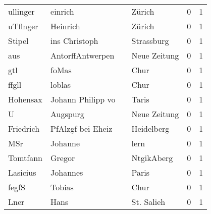 \begin{tabular}{llllrr}
                 ullinger &                            einrich &             &                                      Zürich &          0 &         1 \\
                 uTflnger &                           Heinrich &             &                                      Zürich &          0 &         1 \\
                   Stipel &                      ins Christoph &             &                                  Strassburg &          0 &         1 \\
                      aus &                   AntorffAntwerpen &             &                                Neue Zeitung &          0 &         1 \\
                      gtl &                              foMas &             &                                        Chur &          0 &         1 \\
                    ffgll &                             loblas &             &                                        Chur &          0 &         1 \\
                 Hohensax &                  Johann Philipp vo &             &                                       Taris &          0 &         1 \\
                        U &                           Augspurg &             &                                Neue Zeitung &          0 &         1 \\
                Friedrich &                  PfAlzgf bei Eheiz &             &                                  Heidelberg &          0 &         1 \\
                      MSr &                            Johanne &             &                                        lern &          0 &         1 \\
                 Tomtfann &                             Gregor &             &                                  NtgikAberg &          0 &         1 \\
                 Lasicius &                           Johannes &             &                                       Paris &          0 &         1 \\
                    fegfS &                             Tobias &             &                                        Chur &          0 &         1 \\
                     Lner &                               Hans &             &                                  St. Salieh &          0 &         1 \\

\end{tabular}
